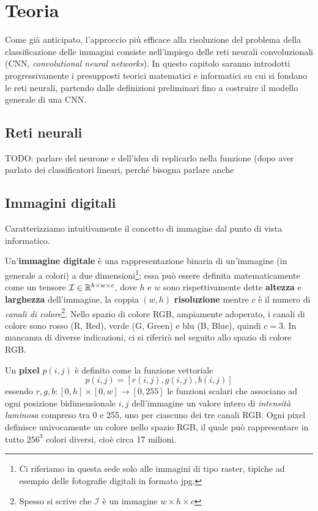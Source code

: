 \chapter{Teoria}\label{teoria}
\pagestyle{fancy}
\fancyhf{}
\fancyhead[OL]{\rightmark}
\cfoot{\thepage}

Come già anticipato, l'approccio più efficace alla risoluzione del problema della classificazione delle immagini consiste nell'impiego delle reti neurali convoluzionali (CNN, \emph{convolutional neural networks}). In questo capitolo saranno introdotti progressivamente i presupposti teorici matematici e informatici su cui si fondano le reti neurali, partendo dalle definizioni preliminari fino a costruire il modello generale di una CNN.



\section{Reti neurali}

TODO: parlare del neurone e dell'idea di replicarlo nella funzione (dopo aver parlato dei classificatori lineari, perché bisogna parlare anche 

\section{Immagini digitali}
Caratterizziamo intuitivamente il concetto di immagine dal punto di vista informatico.

Un'\textbf{immagine digitale} è una rappresentazione binaria di un'immagine (in generale a colori) a due dimensioni\footnote{Ci riferiamo in questa sede solo alle immagini di tipo raster, tipiche ad esempio delle fotografie digitali in formato jpg.}; essa può essere definita matematicamente come un tensore $\mathcal{I}\in\mathbb{R}^{h\times w\times c}$, dove $h$ e $w$ sono rispettivamente dette \textbf{altezza} e \textbf{larghezza} dell'immagine, la coppia $(w,h)$ \textbf{risoluzione} mentre $c$ è il numero di \emph{canali di colore}\footnote{Spesso si scrive che $\mathcal{I}$ è un immagine $w\times h\times c$}. Nello spazio di colore RGB, ampiamente adoperato, i canali di colore sono rosso (R, Red), verde (G, Green) e blu (B, Blue), quindi $c=3$. In mancanza di diverse indicazioni, ci si riferirà nel seguito allo spazio di colore RGB.

Un \textbf{pixel} $p(i,j)$ è definito come la funzione vettoriale
\[p(i,j)=[r(i,j),g(i,j),b(i,j)]\]
essendo $r,g,b:[0,h]\times[0,w]\to[0,255]$ le funzioni scalari che associano ad ogni posizione bidimensionale $i,j$ dell'immagine un valore intero di \emph{intensità luminosa} compreso tra 0 e 255, uno per ciascuno dei tre canali RGB. Ogni pixel definisce univocamente un colore nello spazio RGB, il quale può rappresentare in tutto $256^{3}$ colori diversi, cioè circa 17 milioni.

